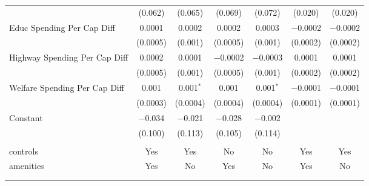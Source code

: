 \begin{table}[!htbp]
\begin{tabular}{@{\extracolsep{5pt}}lcccccc}
  & (0.062) & (0.065) & (0.069) & (0.072) & (0.020) & (0.020) \\ 
  Educ Spending Per Cap Diff & 0.0001 & 0.0002 & 0.0002 & 0.0003 & $-$0.0002 & $-$0.0002 \\ 
  & (0.0005) & (0.001) & (0.0005) & (0.001) & (0.0002) & (0.0002) \\ 
  Highway Spending Per Cap Diff & 0.0002 & 0.0001 & $-$0.0002 & $-$0.0003 & 0.0001 & 0.0001 \\ 
  & (0.0005) & (0.001) & (0.0005) & (0.001) & (0.0002) & (0.0002) \\ 
  Welfare Spending Per Cap Diff & 0.001 & 0.001$^{*}$ & 0.001 & 0.001$^{*}$ & $-$0.0001 & $-$0.0001 \\ 
  & (0.0003) & (0.0004) & (0.0004) & (0.0004) & (0.0001) & (0.0001) \\ 
  Constant & $-$0.034 & $-$0.021 & $-$0.028 & $-$0.002 &  &  \\ 
  & (0.100) & (0.113) & (0.105) & (0.114) &  &  \\ 
 \hline \\[-1.8ex] 
controls & Yes & Yes & No & No & Yes & Yes \\ 
amenities & Yes & No & Yes & No & Yes & No \\ 
\hline \\[-1.8ex] 
\hline 
\hline \\[-1.8ex] 
\end{tabular} 
\end{table} 
